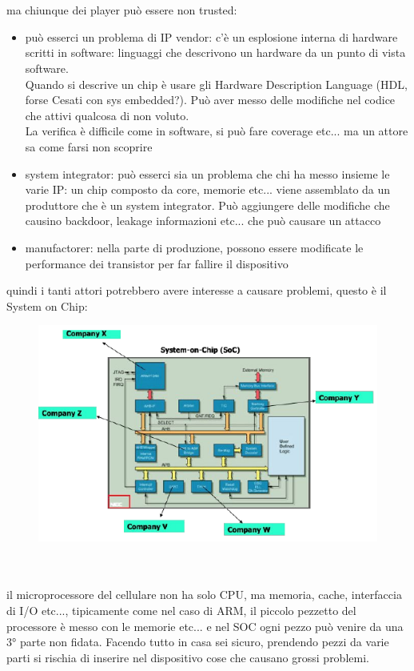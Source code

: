 \documentclass[oneside, 12pt]{extbook}
\begin{document}
\\\\ma chiunque dei player può essere non trusted:
\begin{itemize}
	\item può esserci un problema di IP vendor: c'è un esplosione interna di hardware scritti in software: linguaggi che descrivono un hardware da un punto di vista software.
	\\Quando si descrive un chip è usare gli Hardware Description Language (HDL, forse Cesati con sys embedded?). Può aver messo delle modifiche nel codice che attivi qualcosa di non voluto.
	\\La verifica è difficile come in software, si può fare coverage etc... ma un attore sa come farsi non scoprire
	\item system integrator: può esserci sia un problema che chi ha messo insieme le varie IP: un chip composto da core, memorie etc... viene assemblato da un produttore che è un system integrator. Può aggiungere delle modifiche che causino backdoor, leakage informazioni etc... che può causare un attacco
	\item manufactorer: nella parte di produzione, possono essere modificate le performance dei transistor per far fallire il dispositivo
\end{itemize}
quindi i tanti attori potrebbero avere interesse a causare problemi, questo è il System on Chip:\\
\begin{figure}[!h]
	\includegraphics[scale=.5]{immagini/hardware/soc.png}
\end{figure}
\\\\il microprocessore del cellulare non ha solo CPU, ma memoria, cache, interfaccia di I/O etc..., tipicamente come nel caso di ARM, il piccolo pezzetto del processore è messo con le memorie etc... e nel SOC ogni pezzo può venire da una 3° parte non fidata. Facendo tutto in casa sei sicuro, prendendo pezzi da varie parti si rischia di inserire nel dispositivo cose che causano grossi problemi.
\end{document}
